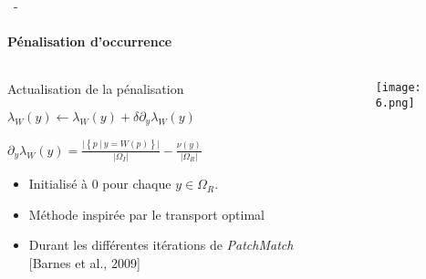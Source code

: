 \documentclass[aspectratio=169, 22pt]{beamer}
\begin{document}
\begin{frame}{\secname~- \subsecname}
  \framesubtitle{Pénalisation d'occurrence}
  \begin{columns}
    \begin{column}{0.5\linewidth}      
      \begin{block}{Actualisation de la pénalisation}
        \small
        \begin{center}
          $\lambda_W(y) \leftarrow \lambda_W(y) + \delta \partial_y \lambda_W(y) $
          
          $\partial_y\lambda_W(y) = \frac{\lvert\left\{p\ |\ y =
              W(p)\right\}\rvert}{\lvert\Omega_I\rvert} -
          \frac{\nu(y)}{\lvert\Omega_R\rvert}$
        \end{center}
        
        \begin{itemize}
        \item Initialisé à 0 pour chaque $y \in \Omega_R$.
        \item Méthode inspirée par le transport optimal
        \item Durant les différentes itérations de \emph{PatchMatch} [Barnes et al., 2009]
        \end{itemize}
      \end{block}    
    \end{column}
    
    \begin{column}{0.5\linewidth}
      \begin{figure}
        \centering
        \texttt{[image: 6.png]}
      \end{figure}
    \end{column}
  \end{columns}
\end{frame}
\end{document}

